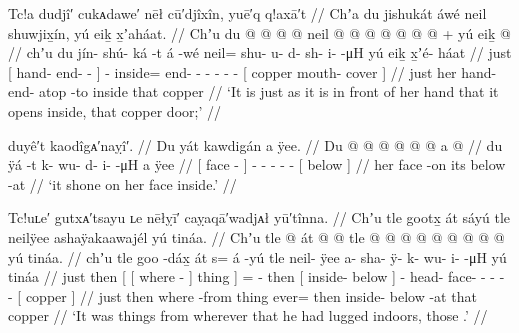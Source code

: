 \ex\label{ex:89-168-it-opened-before-her-copper-door}%
%
\begingl
	\glpreamble	Tc!a dudjî′ cukᴀdawe′ nēł cū′djîxîn, yuē′q q!axā′t //
	\glpreamble	Chʼa du jishukát áwé neil shuwjix̱ín, yú eiḵ x̱ʼaháat. //
	\gla	Chʼu {} du  @ {} @ {} @ {} {}  @ {}
		neil @  @ {} @ {} @ {} @ {} @ {} @ {} +
		{} yú eiḵ  @ {} {} //
	\glb	chʼu {} du jín- shú- ká -t {} á -wé
		neil= shu- u- d- sh- i-  -μH
		{} yú eiḵ x̱ʼé- háat {} //
	\glc	just {}[  hand- end-  - {}]  -
		inside= end- - - - -  -
		{}[  copper mouth- cover {}] //
	\gld	just {} her hand- end- atop -to {}  {}
		inside  {} {} {} {} {} {}
		{} that copper  {} {} //
	\glft	‘It is just as it is in front of her hand that it opens inside, that copper door;’
		//
\endgl
\xe

\ex\label{ex:89-169-shone-on-her-face}%
%
\begingl
	\glpreamble	duyê′t kaodîgᴀ′naỵî′. //
	\glpreamble	Du yát kawdigán a ÿee. //
	\gla	{} Du  @ {} {}
		 @ {} @ {} @ {} @ {} @ {}
		{} a  @ {} {} //
	\glb	{} du ÿá -t {}
		k- wu- d- i-  -μH
		{} a ÿee {} {} //
	\glc	{}[  face - {}]
		- - - -  -
		{}[  below \· {}] //
	\gld	{} her face -on {}
		 {} {} {} {} {}
		{} its below -at {} //
	\glft	‘it shone on her face inside.’
		//
\endgl
\xe

\ex\label{ex:89-170-from-somewhere-lugged-inside-tinaa}%
%
\begingl
	\glpreamble	Tc!uʟe′ gutxᴀ′tsayu ʟe nēłỵī′ caỵaqā′wadjᴀł yū′tînna. //
	\glpreamble	Chʼu tle gootx̱ át sáyú tle neilÿee ashaÿakaawajél yú tináa. //
	\gla	Chʼu tle {} {}  @ {} {} át {}  @ {} @ {}
		tle {}  @ {} @ {} {}
		 @ {} @ {} @ {} @ {} @ {} @ {} @ {}
		{} yú tináa. {} //
	\glb	chʼu tle {} {} goo -dáx̱ {} át {} s= á -yú
		tle {} neil- ÿee {} {}
		a- sha- ÿ- k- wu- i-  -μH
		{} yú tináa {} //
	\glc	just then {}[ {}[ where - {}] thing {}] =  -
		then {}[ inside- below \· {}]
		- head- face- - - -  -
		{}[  copper {}] //
	\gld	just then {} {} where -from {} thing {} ever=  {}
		then {} inside- below -at {}
		 {} {} {} {} {} {} {}
		{} that copper {} //
	\glft	‘It was things from wherever that he had lugged indoors, those .’
		//
\endgl
\xe

